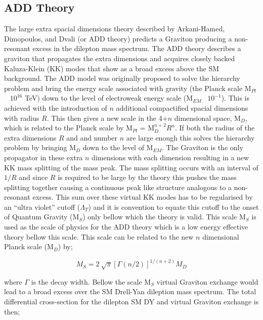     \subsection{ADD Theory}
        The large extra spacial dimensions theory described by Arkani-Hamed, Dimopoulos, and Dvali (or ADD theory) \cite{ArkaniHamed:1998rs} predicts a Graviton producing a non-resonant excess in the dilepton mass spectrum. The ADD theory describes a graviton that propagates the extra dimensions and acquires closely backed Kaluza-Klein (KK) modes that show as a broad excess above the SM background. 
        The ADD model was originally proposed to solve the hierarchy problem and bring the energy scale associated with gravity (the Planck scale M$_{Pl}$ ~ $10^{16}$ TeV) down to the level of electroweak energy scale (M$_{EM}$~ $10^{-1}$). This is achieved with the introduction of $n$ additional compactified spacial dimensions with radius $R$. This then gives a new scale in the 4+$n$ dimensional space, M$_{D}$, which is related to the Planck scale by M$_{Pl}$ = M$_{D}^{n+2}R^{n}$. If both the radius of the extra dimensions $R$ and and number $n$ are large enough this solves the hierarchy problem by bringing M$_{D}$ down to the level of M$_{EM}$.
        The Graviton is the only propagator in these extra $n$ dimensions with each dimension resulting in a new KK mass splitting of the mass peak. The mass splitting occurs with an interval of $1/R$ and since $R$ is required to be large by the theory this pushes the mass splitting together causing a continuous peak like structure analogous to a non-resonant excess. This sum over these virtual KK modes has to be regularised by an ``ultra violet'' cutoff ($\Lambda_{T}$) and it is convention to equate this cutoff to the onset of Quantum Gravity (M$_{S}$) only bellow which the theory is valid. This scale M$_{S}$ is used as the scale of physics for the ADD theory which is a low energy effective theory bellow this scale. This scale can be related to the new $n$ dimensional Planck scale (M$_{D}$) by;

        \begin{equation}
            M_{S} = 2~\sqrt{\pi}\left[{\Gamma (n/2)}\right]^{1/(n+2)}M_{D}
            \label{eq:gravScale}
        \end{equation}

        where $\Gamma$ is the decay width. Bellow the scale M$_{S}$ virtual Graviton exchange would lead to a broad excess over the SM Drell-Yan dileption mass spectrum. 
        The total differential cross-section for the dilepton SM DY and virtual Graviton exchange is then;

